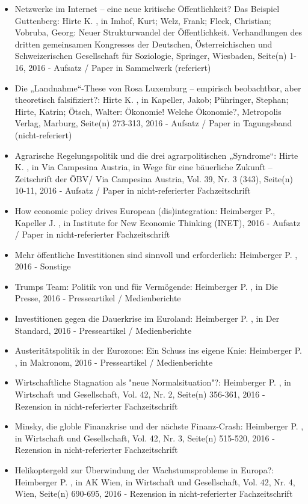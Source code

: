 \begin{itemize}
	 \item Netzwerke im Internet – eine neue kritische Öffentlichkeit? Das Beispiel Guttenberg: Hirte K. , in Imhof, Kurt; Welz, Frank; Fleck, Christian; Vobruba, Georg: Neuer Strukturwandel der Öffentlichkeit. Verhandlungen des dritten gemeinsamen Kongresses der Deutschen, Österreichischen und Schweizerischen Gesellschaft für Soziologie, Springer, Wiesbaden, Seite(n) 1-16, 2016 - Aufsatz / Paper in Sammelwerk (referiert)
	 \item Die „Landnahme“-These von Rosa Luxemburg – empirisch beobachtbar, aber theoretisch falsifiziert?: Hirte K. , in Kapeller, Jakob; Pühringer, Stephan; Hirte, Katrin; Ötsch, Walter: Ökonomie! Welche Ökonomie?, Metropolis Verlag, Marburg, Seite(n) 273-313, 2016 - Aufsatz / Paper in Tagungsband (nicht-referiert)
	 \item Agrarische Regelungspolitik und die drei agrarpolitischen „Syndrome“: Hirte K. , in Via Campesina Austria, in Wege für eine bäuerliche Zukunft – Zeitschrift der ÖBV/ Via Campesina Austria, Vol. 39, Nr. 3 (343), Seite(n) 10-11, 2016 - Aufsatz / Paper in nicht-referierter Fachzeitschrift
	 \item How economic policy drives European (dis)integration: Heimberger P., Kapeller J. , in Institute for New Economic Thinking (INET), 2016 - Aufsatz / Paper in nicht-referierter Fachzeitschrift
	 \item Mehr öffentliche Investitionen sind sinnvoll und erforderlich: Heimberger P. , 2016 - Sonstige
	 \item Trumps Team: Politik von und für Vermögende: Heimberger P. , in Die Presse, 2016 - Presseartikel / Medienberichte
	 \item Investitionen gegen die Dauerkrise im Euroland: Heimberger P. , in Der Standard, 2016 - Presseartikel / Medienberichte
	 \item Austeritätspolitik in der Eurozone: Ein Schuss ins eigene Knie: Heimberger P. , in Makronom, 2016 - Presseartikel / Medienberichte
	 \item Wirtschaftliche Stagnation als "neue Normalsituation"?: Heimberger P. , in Wirtschaft und Gesellschaft, Vol. 42, Nr. 2, Seite(n) 356-361, 2016 - Rezension in nicht-referierter Fachzeitschrift
	 \item Minsky, die globle Finanzkrise und der nächste Finanz-Crash: Heimberger P. , in Wirtschaft und Gesellschaft, Vol. 42, Nr. 3, Seite(n) 515-520, 2016 - Rezension in nicht-referierter Fachzeitschrift
	 \item Helikoptergeld zur Überwindung der Wachstumsprobleme in Europa?: Heimberger P. , in AK Wien, in Wirtschaft und Gesellschaft, Vol. 42, Nr. 4, Wien, Seite(n) 690-695, 2016 - Rezension in nicht-referierter Fachzeitschrift

\end{itemize}
